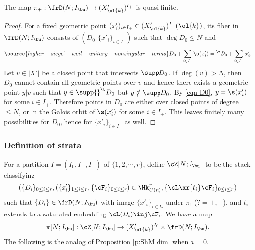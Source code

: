 \begin{lemma}
\notready\label{l:dim D}
The map $\pi_{+}: \frD(N;I_{\bu})\to (X'_{\ol{k}})^{I_{+}}$ is quasi-finite.
\end{lemma}
\begin{proof}
For a fixed geometric point $(x'_{i})_{i\in I_{+}} \in (X'_{\ol{k}})^{I_{+}}(\ol{k})$, its fiber in $\frD(N;I_{\bu})$ consists of $(D_{0}, \{x'_{i}\}_{i\in I_{-}})$ such that $\deg D_{0}\le N$ and
\begin{equation}\label{eqn D0}
\source{higher-siegel-weil-unitary-nonsingular-terms}
D_{0}+\sum_{i\in I_{+}} \s(x'_{i})={}^{\t}D_{0}+\sum_{i\in I_{-}} x'_{i}.
\end{equation}
Let $v\in |X'|$ be a closed point that intersects $\supp D_{0}$. If $\deg(v)>N$, then $D_{0}$ cannot contain all geometric points over $v$ and hence there exists a geometric point $y|v$ such that $y\in \supp {}^{\t}D_{0}$ but $y\notin \supp D_{0}$. By \eqref{eqn D0}, $y=\s(x'_{i})$ for some $i\in I_{+}$.  Therefore points in $D_{0}$ are either over closed points of degree $\le N$, or in the Galois orbit of $\s(x'_{i})$ for some $i\in I_{+}$. This leaves finitely many possibilities for $D_{0}$, hence for $\{x'_{i}\}_{i\in I_{-}}$ as well.
\end{proof}





\subsubsection{Definition of strata} For a partition $I=(I_{0},I_{+},I_{-})$ of $\{1,2,\cdots, r\}$, define $\cZ[N;I_{\bu}]$ to be the stack classifying
\[
(\{D_{i}\}_{0\le i\le r},( \{x'_{i}\}_{1\le i\le r}, \{\cF_{i}\}_{0\le i\le r})\in \Hk^{r}_{U(n)}, \{\cL\xr{t_{i}}\cF_{i}\}_{0\le i\le r})
\]
such that $\{D_{i}\}\in \frD(N;I_{\bu})$ with image $\{x'_{i}\}_{i\in I_{?}}$ under $\pi_{?}$ ($?=+,-$), and $t_{i}$ extends to a saturated embedding $\cL(D_{i})\inj \cF_{i}$. We have a map
\begin{equation}
\pi[N;I_{\bu}]: \cZ[N;I_{\bu}]\to (X'_{\ol{k}})^{I_{0}}\times \frD(N;I_{\bu}).
\end{equation}
The following is the analog of Proposition \ref{p:ShM dim} when $a=0$.

